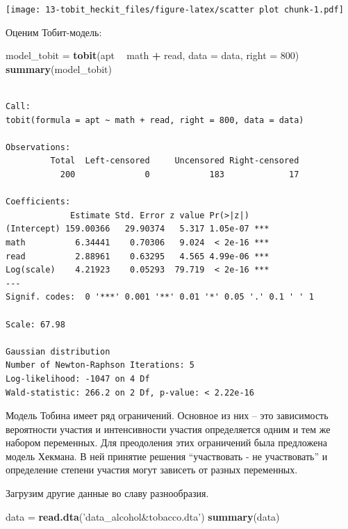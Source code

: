 \documentclass[]{book}
\newenvironment{Shaded}{\begin{snugshade}}{\end{snugshade}}
\newcommand{\DataTypeTok}[1]{\textcolor[rgb]{0.13,0.29,0.53}{#1}}
\newcommand{\DecValTok}[1]{\textcolor[rgb]{0.00,0.00,0.81}{#1}}
\newcommand{\KeywordTok}[1]{\textcolor[rgb]{0.13,0.29,0.53}{\textbf{#1}}}
\newcommand{\NormalTok}[1]{#1}
\newcommand{\OperatorTok}[1]{\textcolor[rgb]{0.81,0.36,0.00}{\textbf{#1}}}
\newcommand{\StringTok}[1]{\textcolor[rgb]{0.31,0.60,0.02}{#1}}
\begin{document}
\texttt{[image: 13-tobit\_heckit\_files/figure-latex/scatter plot chunk-1.pdf]}

Оценим Тобит-модель:

\begin{Shaded}
\begin{Highlighting}[]
\NormalTok{model_tobit =}\StringTok{ }\KeywordTok{tobit}\NormalTok{(apt }\OperatorTok{~}\StringTok{ }\NormalTok{math }\OperatorTok{+}\StringTok{ }\NormalTok{read, }\DataTypeTok{data =}\NormalTok{ data, }\DataTypeTok{right =} \DecValTok{800}\NormalTok{)}
\KeywordTok{summary}\NormalTok{(model_tobit)}
\end{Highlighting}
\end{Shaded}

\begin{verbatim}

Call:
tobit(formula = apt ~ math + read, right = 800, data = data)

Observations:
         Total  Left-censored     Uncensored Right-censored 
           200              0            183             17 

Coefficients:
             Estimate Std. Error z value Pr(>|z|)    
(Intercept) 159.00366   29.90374   5.317 1.05e-07 ***
math          6.34441    0.70306   9.024  < 2e-16 ***
read          2.88961    0.63295   4.565 4.99e-06 ***
Log(scale)    4.21923    0.05293  79.719  < 2e-16 ***
---
Signif. codes:  0 '***' 0.001 '**' 0.01 '*' 0.05 '.' 0.1 ' ' 1

Scale: 67.98 

Gaussian distribution
Number of Newton-Raphson Iterations: 5 
Log-likelihood: -1047 on 4 Df
Wald-statistic: 266.2 on 2 Df, p-value: < 2.22e-16 
\end{verbatim}

Модель Тобина имеет ряд ограничений. Основное из них -- это зависимость вероятности участия и интенсивности участия определяется одним и тем же набором переменных. Для преодоления этих ограничений была предложена модель Хекмана. В ней принятие решения ``участвовать - не участвовать'' и определение степени участия могут зависеть от разных переменных.

Загрузим другие данные во славу разнообразия.

\begin{Shaded}
\begin{Highlighting}[]
\NormalTok{data =}\StringTok{ }\KeywordTok{read.dta}\NormalTok{(}\StringTok{'data_alcohol&tobacco.dta'}\NormalTok{)}
\KeywordTok{summary}\NormalTok{(data)}
\end{Highlighting}
\end{Shaded}
\end{document}
